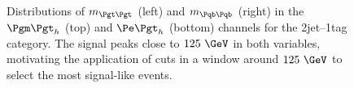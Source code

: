\begin{figure}
\begin{center}

\end{center}
\caption{
Distributions of $m_{\Pgt\Pgt}$ (left) and $m_{\Pqb\Pqb}$ (right) in the $\mutau$ (top) and
$\etau$ (bottom) channels for the 2jet--1tag category. The signal peaks close to $125~\GeV$ in both
variables, motivating the application of cuts in a window around $125~\GeV$ to
select the most signal-like events.}
\label{fig:2jet1tagmttmbb}
\end{figure} 

